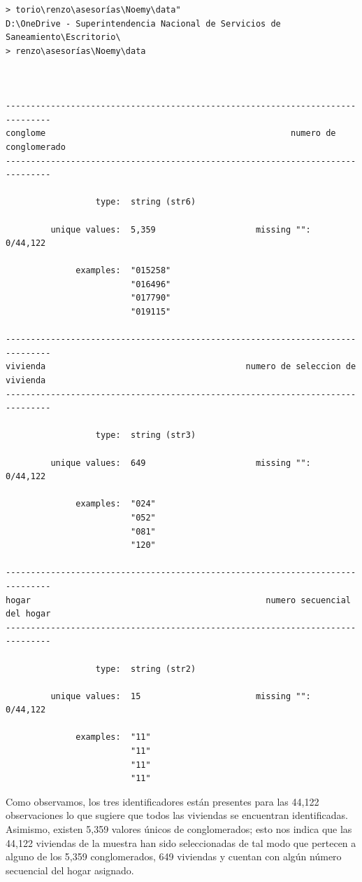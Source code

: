 \documentclass[
]{book}
\theoremstyle{definition}
\theoremstyle{definition}
\theoremstyle{definition}
\theoremstyle{definition}
\theoremstyle{remark}
\begin{document}
\begin{verbatim}
> torio\renzo\asesorías\Noemy\data"
D:\OneDrive - Superintendencia Nacional de Servicios de Saneamiento\Escritorio\
> renzo\asesorías\Noemy\data



-------------------------------------------------------------------------------
conglome                                                 numero de conglomerado
-------------------------------------------------------------------------------

                  type:  string (str6)

         unique values:  5,359                    missing "":  0/44,122

              examples:  "015258"
                         "016496"
                         "017790"
                         "019115"

-------------------------------------------------------------------------------
vivienda                                        numero de seleccion de vivienda
-------------------------------------------------------------------------------

                  type:  string (str3)

         unique values:  649                      missing "":  0/44,122

              examples:  "024"
                         "052"
                         "081"
                         "120"

-------------------------------------------------------------------------------
hogar                                               numero secuencial del hogar
-------------------------------------------------------------------------------

                  type:  string (str2)

         unique values:  15                       missing "":  0/44,122

              examples:  "11"
                         "11"
                         "11"
                         "11"
\end{verbatim}

Como observamos, los tres identificadores están presentes para las 44,122 observaciones lo que sugiere que todos las viviendas se encuentran identificadas. Asimismo, existen 5,359 valores únicos de conglomerados; esto nos indica que las 44,122 viviendas de la muestra han sido seleccionadas de tal modo que pertecen a alguno de los 5,359 conglomerados, 649 viviendas y cuentan con algún número secuencial del hogar asignado.
\end{document}
